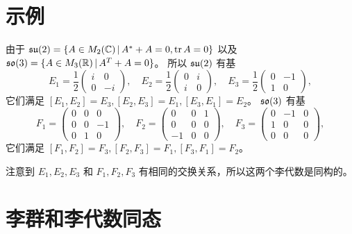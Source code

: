 \section{示例}

\begin{example}\label{exa:base of su2 and so3}
  由于 $\mathfrak{su}(2)=\{A\in M_2(\mathbb C)\,|\, A^*+A=0,\operatorname{tr} A=0\}$
  以及 $\mathfrak{so}(3)=\{A\in M_3(\mathbb R)\,|\, A^T+A=0\}$。
  所以 $\mathfrak{su}(2)$ 有基
  \[
    E_1=\frac{1}{2}\begin{pmatrix}
      i & 0 \\
      0 & -i
    \end{pmatrix},\quad
    E_2=\frac{1}{2}\begin{pmatrix}
      0 & i \\
      i & 0
    \end{pmatrix},\quad
    E_3=\frac{1}{2}\begin{pmatrix}
      0 & -1 \\
      1 & 0
    \end{pmatrix},
  \]
  它们满足 $[E_1,E_2]=E_3,[E_2,E_3]=E_1,[E_3,E_1]=E_2$。
  $\mathfrak{so}(3)$ 有基
  \[
    F_1=\begin{pmatrix}
      0 & 0 & 0 \\
      0 & 0 & -1 \\
      0& 1 & 0
    \end{pmatrix},\quad
    F_2=\begin{pmatrix}
      0 & 0 & 1 \\
      0 & 0 & 0 \\
      -1 & 0 & 0 
    \end{pmatrix},\quad
    F_3=\begin{pmatrix}
      0 & -1 & 0\\
      1 & 0 & 0 \\
      0 & 0 & 0
    \end{pmatrix},
  \]
  它们满足 $[F_1,F_2]=F_3,[F_2,F_3]=F_1,[F_3,F_1]=F_2$。

  注意到 $E_1,E_2,E_3$ 和 $F_1,F_2,F_3$ 有相同的交换关系，所以这两个李代数是同构的。
\end{example}

\section{李群和李代数同态}

